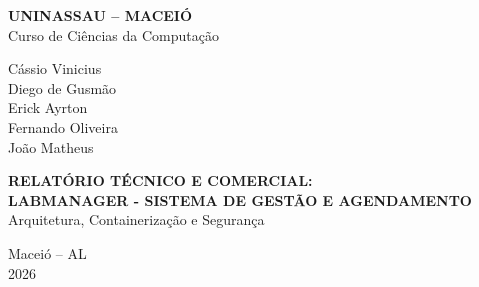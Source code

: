 \documentclass[12pt,a4paper]{article}
\begin{document}
	
	
	\begin{titlepage}
		
		\begin{center}
			
			{\large \textbf{UNINASSAU -- MACEIÓ}}\\[0.5cm]
			
			{\large Curso de Ciências da Computação}
			
			\vfill
			
			{\large
				Cássio Vinicius\\
				Diego de Gusmão\\
				Erick Ayrton\\
				Fernando Oliveira\\
				João Matheus
			}
			
			\vfill
			
			{\large \textbf{RELATÓRIO TÉCNICO E COMERCIAL:}\\[0.2cm]
				\textbf{LABMANAGER - SISTEMA DE GESTÃO E AGENDAMENTO}\\[0.3cm]
				Arquitetura, Containerização e Segurança}
			
			\vfill
			
			Maceió -- AL\\
			2026
			
		\end{center}
		
	\end{titlepage}
	
	
\end{document}
